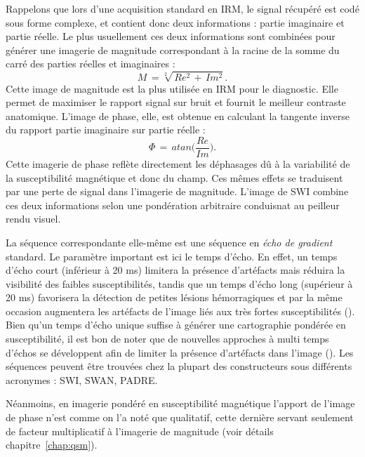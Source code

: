 Rappelons que lors d’une acquisition standard en IRM, le signal récupéré est codé sous forme complexe, et contient donc deux informations : partie imaginaire et partie réelle. Le plus usuellement ces deux informations sont combinées pour générer une imagerie de magnitude correspondant à la racine de la somme du carré des parties réelles et imaginaires :
\begin{equation}
M\,=\sqrt[2]{\,Re^2\,+\,Im^2}.
\end{equation}
Cette image de magnitude est la plus utilisée en IRM pour le diagnostic. Elle permet de maximiser le rapport signal sur bruit et fournit le meilleur contraste anatomique. L’image de phase, elle, est obtenue en calculant la tangente inverse du rapport partie imaginaire sur partie réelle :
\begin{equation}
\Phi\,=\,atan\biggl(\frac{Re}{Im}\biggr).
\end{equation}
Cette imagerie de phase reflète directement les déphasages dû à la variabilité de la susceptibilité magnétique et donc du champ. Ces mêmes effets se traduisent par une perte de signal dans l’imagerie de magnitude. L'image de SWI combine ces deux informations selon une pondération arbitraire conduisnat au peilleur rendu visuel. 

La séquence correspondante elle-même est une séquence en {\em écho de gradient} standard. Le paramètre important est ici le temps d’écho. En effet, un temps d’écho court (inférieur à 20 ms) limitera la présence d’artéfacts mais réduira la visibilité des faibles susceptibilités, tandis que un temps d’écho long (supérieur à 20 ms) favorisera la détection de petites lésions hémorragiques et par la même occasion augmentera les artéfacts de l’image liés aux très fortes susceptibilités (\cite{Kressler2010}). Bien qu’un temps d’écho unique suffise à générer une cartographie pondérée en susceptibilité, il est bon de noter que de nouvelles approches à multi temps d’échos se développent afin de limiter la présence d’artéfacts dans l’image (\cite{Oh2013}). Les séquences peuvent être trouvées chez la plupart des constructeurs sous différents acronymes : SWI, SWAN, PADRE.

Néanmoins, en imagerie pondéré en susceptibilité magnétique l’apport de l’image de phase n’est comme on l'a noté que qualitatif, cette dernière servant seulement de facteur multiplicatif à l’imagerie de magnitude (voir détails chapitre~\ref{chap:qsm}).

